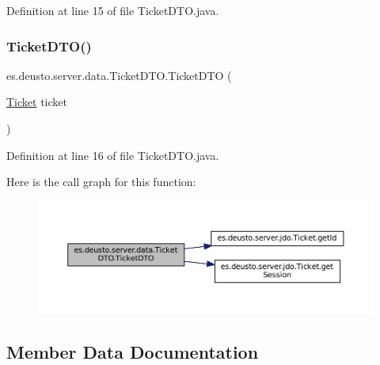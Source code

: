 Definition at line 15 of file Ticket\+D\+T\+O.\+java.

\mbox{\label{classes_1_1deusto_1_1server_1_1data_1_1_ticket_d_t_o_ad3d32eef4ab6ad5ea98cc7aa35d3de50}} 
\subsubsection{\texorpdfstring{TicketDTO()}{TicketDTO()}\hspace{0.1cm}{\footnotesize\ttfamily [2/2]}}
{\footnotesize\ttfamily es.\+deusto.\+server.\+data.\+Ticket\+D\+T\+O.\+Ticket\+D\+TO (\begin{DoxyParamCaption}\item[{\mbox{\hyperlink{classes_1_1deusto_1_1server_1_1jdo_1_1_ticket}{Ticket}}}]{ticket }\end{DoxyParamCaption})}



Definition at line 16 of file Ticket\+D\+T\+O.\+java.

Here is the call graph for this function\+:\nopagebreak
\begin{figure}[H]
\begin{center}
\leavevmode
\includegraphics[width=350pt]{classes_1_1deusto_1_1server_1_1data_1_1_ticket_d_t_o_ad3d32eef4ab6ad5ea98cc7aa35d3de50_cgraph}
\end{center}
\end{figure}


\subsection{Member Data Documentation}
\mbox{\label{classes_1_1deusto_1_1server_1_1data_1_1_ticket_d_t_o_a1602514fbada31dc44edc01bf359c401}} 
